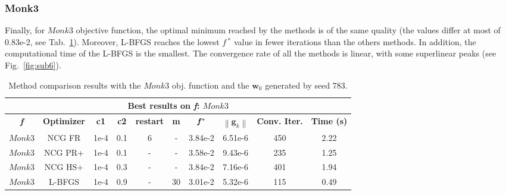 \documentclass[11pt]{article}
\newcommand{\norm}[1]{\left\lVert#1\right\rVert}
\begin{document}
\subsubsection{Monk3}

Finally, for $Monk3$ objective function, the optimal minimum reached by the methods is of the same quality (the values differ at most of 0.83e-2, see Tab.~\ref{tab:monk3_method_comparisons}). Moreover, L-BFGS reaches the lowest $\textit{f}\,^*$ value in fewer iterations than the others methods. In addition, the computational time of the L-BFGS is the smallest. The convergence rate of all the methods is linear, with some superlinear peaks (see Fig.~\ref{fig:sub6}).

\begin{table}[H]
\small
    \centering
    \begin{tabular}{ |c|c|c|c|c|c|c|c|c|c|}
    \hline
     \multicolumn{10}{|c|}{\textbf{Best results on \textit{f}: $Monk3$}} \\
      \hline
       \textbf{\textit{f}} & \textbf{Optimizer} & \textbf{c1} &  \textbf{c2} & \textbf{restart} & \textbf{m} & $\mathbf{\textit{\textbf{f}}\,^*}$ & $\norm{\mathbf{g}_k}$ & \textbf{Conv. Iter.} & \textbf{Time (s)}\\
     \hline
      $Monk3$ & NCG FR & 1e-4 & 0.1  & 6  & -  & 3.84e-2  & 6.51e-6 & 450  & 2.22 \\
      \hline
      $Monk3$ & NCG PR+ & 1e-4 & 0.1  & -  & -  & 3.58e-2  & 9.43e-6 & 235  & 1.25 \\
      \hline
      $Monk3$ & NCG HS+ & 1e-4 & 0.3  & -  & -  & 3.84e-2  & 7.16e-6 & 401  & 1.94 \\
      \hline
      $Monk3$ & L-BFGS & 1e-4 & 0.9  & -  & 30  & 3.01e-2  & 5.32e-6 & 115  & 0.49\\
      \hline
    \end{tabular}
    \caption{Method comparison results with the $Monk3$ obj. function and the $\mathbf{w}_0$ generated by seed 783.}
    \label{tab:monk3_method_comparisons}
\end{table}
\end{document}

